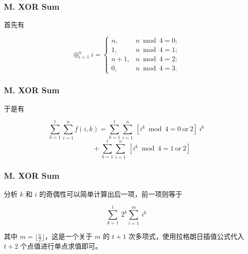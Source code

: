 \renewcommand{\problemname}{M. XOR Sum}

\begin{frame}\frametitle{\problemname}
    首先有

    $$ \oplus_{i=1}^{n}i =\left\{
    \begin{array}{rcl}
    n,   & n \bmod 4 = 0; \\
    1,   & n \bmod 4 = 1; \\
    n+1, & n \bmod 4 = 2; \\
    0,   & n \bmod 4 = 3.
    \end{array} \right. $$    
\end{frame}


\begin{frame}\frametitle{\problemname}
    于是有
    
    $$
    \sum_{k=1}^{t} \sum_{i=1}^{n} f(i,k) = \sum_{k=1}^{t}\sum_{i=1}^{n}\ [i^k \bmod 4 = 0\ \text{or}\ 2]\ i^k $$
    $$\qquad \qquad \ \ + \sum_{k=1}^{t} \sum_{i=1}^{n}\ [i^k \bmod 4 = 1\ \text{or}\ 2]
    $$
    
\end{frame}


\begin{frame}\frametitle{\problemname} 
分析 $k$ 和 $i$ 的奇偶性可以简单计算出后一项，前一项则等于
    
$$ \sum_{k=1}^{t}\ 2^k\sum_{i=1}^{m}\ i^k $$

其中 $m = \lfloor \frac{n}{2} \rfloor$，这是一个关于 $m$ 的 $t+1$ 次多项式，使用拉格朗日插值公式代入 $t+2$ 个点值进行单点求值即可。

\end{frame}